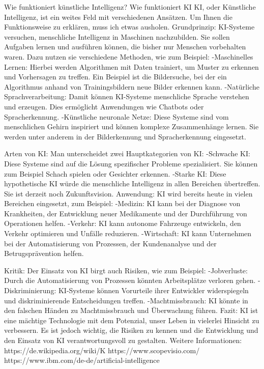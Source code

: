 \documentclass{article}
\begin{document}
{    
    Wie funktioniert künstliche Intelligenz?
    Wie funktioniert KI
    KI, oder Künstliche Intelligenz, ist ein weites Feld mit verschiedenen Ansätzen. Um Ihnen die Funktionsweise zu erklären, muss ich etwas ausholen.
    Grundprinzip:
    KI-Systeme versuchen, menschliche Intelligenz in Maschinen nachzubilden. Sie sollen Aufgaben lernen und ausführen können, die bisher nur Menschen vorbehalten waren. Dazu nutzen sie verschiedene Methoden, wie zum Beispiel:
    -Maschinelles Lernen: Hierbei werden Algorithmen mit Daten trainiert, um Muster zu erkennen und Vorhersagen zu treffen. Ein Beispiel ist die Bildersuche, bei der ein Algorithmus anhand von Trainingsbildern neue Bilder erkennen kann.
    -Natürliche Sprachverarbeitung: Damit können KI-Systeme menschliche Sprache verstehen und erzeugen. Dies ermöglicht Anwendungen wie Chatbots oder Spracherkennung.
    -Künstliche neuronale Netze: Diese Systeme sind vom menschlichen Gehirn inspiriert und können komplexe Zusammenhänge lernen. Sie werden unter anderem in der Bilderkennung und Spracherkennung eingesetzt.
    
    Arten von KI:
    Man unterscheidet zwei Hauptkategorien von KI:
    -Schwache KI: Diese Systeme sind auf die Lösung spezifischer Probleme spezialisiert. Sie können zum Beispiel Schach spielen oder Gesichter erkennen.
    -Starke KI: Diese hypothetische KI würde die menschliche Intelligenz in allen Bereichen übertreffen. Sie ist derzeit noch Zukunftsvision.
    Anwendung:
    KI wird bereits heute in vielen Bereichen eingesetzt, zum Beispiel:
    -Medizin: KI kann bei der Diagnose von Krankheiten, der Entwicklung neuer Medikamente und der Durchführung von Operationen helfen.
    -Verkehr: KI kann autonome Fahrzeuge entwickeln, den Verkehr optimieren und Unfälle reduzieren.
    -Wirtschaft: KI kann Unternehmen bei der Automatisierung von Prozessen, der Kundenanalyse und der Betrugsprävention helfen.
    
    
    Kritik:
    Der Einsatz von KI birgt auch Risiken, wie zum Beispiel:
    -Jobverluste: Durch die Automatisierung von Prozessen könnten Arbeitsplätze verloren gehen.
    -Diskriminierung: KI-Systeme können Vorurteile ihrer Entwickler widerspiegeln und diskriminierende Entscheidungen treffen.
    -Machtmissbrauch: KI könnte in den falschen Händen zu Machtmissbrauch und Überwachung führen.
    Fazit:
    KI ist eine mächtige Technologie mit dem Potenzial, unser Leben in vielerlei Hinsicht zu verbessern. Es ist jedoch wichtig, die Risiken zu kennen und die Entwicklung und den Einsatz von KI verantwortungsvoll zu gestalten.
    Weitere Informationen:
    https://de.wikipedia.org/wiki/K%
    https://www.scopevisio.com/
    https://www.ibm.com/de-de/artificial-intelligence
    
}
\end{document}
